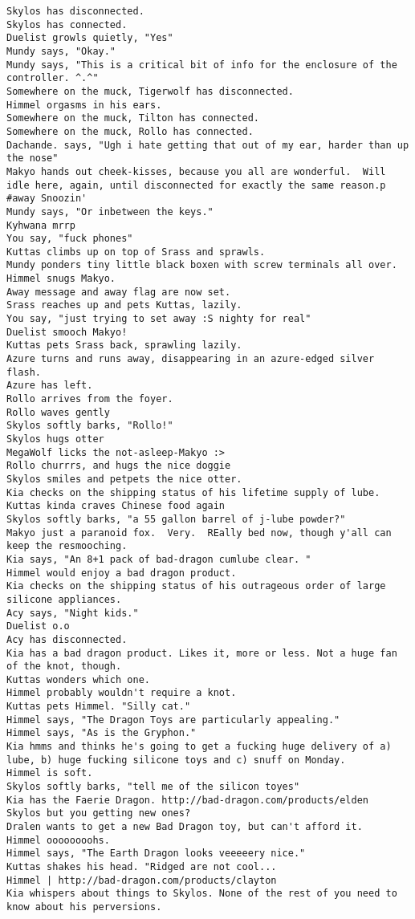 \begin{verbatim}
Skylos has disconnected.
Skylos has connected.
Duelist growls quietly, "Yes"
Mundy says, "Okay."
Mundy says, "This is a critical bit of info for the enclosure of the controller. ^.^"
Somewhere on the muck, Tigerwolf has disconnected.
Himmel orgasms in his ears.
Somewhere on the muck, Tilton has connected.
Somewhere on the muck, Rollo has connected.
Dachande. says, "Ugh i hate getting that out of my ear, harder than up the nose"
Makyo hands out cheek-kisses, because you all are wonderful.  Will idle here, again, until disconnected for exactly the same reason.p #away Snoozin'
Mundy says, "Or inbetween the keys."
Kyhwana mrrp
You say, "fuck phones"
Kuttas climbs up on top of Srass and sprawls.
Mundy ponders tiny little black boxen with screw terminals all over.
Himmel snugs Makyo.
Away message and away flag are now set.
Srass reaches up and pets Kuttas, lazily.
You say, "just trying to set away :S nighty for real"
Duelist smooch Makyo!
Kuttas pets Srass back, sprawling lazily.
Azure turns and runs away, disappearing in an azure-edged silver flash.
Azure has left.
Rollo arrives from the foyer.
Rollo waves gently
Skylos softly barks, "Rollo!"
Skylos hugs otter
MegaWolf licks the not-asleep-Makyo :>
Rollo churrrs, and hugs the nice doggie
Skylos smiles and petpets the nice otter.
Kia checks on the shipping status of his lifetime supply of lube.
Kuttas kinda craves Chinese food again
Skylos softly barks, "a 55 gallon barrel of j-lube powder?"
Makyo just a paranoid fox.  Very.  REally bed now, though y'all can keep the resmooching.
Kia says, "An 8+1 pack of bad-dragon cumlube clear. "
Himmel would enjoy a bad dragon product.
Kia checks on the shipping status of his outrageous order of large silicone appliances.
Acy says, "Night kids."
Duelist o.o
Acy has disconnected.
Kia has a bad dragon product. Likes it, more or less. Not a huge fan of the knot, though.
Kuttas wonders which one.
Himmel probably wouldn't require a knot.
Kuttas pets Himmel. "Silly cat."
Himmel says, "The Dragon Toys are particularly appealing."
Himmel says, "As is the Gryphon."
Kia hmms and thinks he's going to get a fucking huge delivery of a) lube, b) huge fucking silicone toys and c) snuff on Monday.
Himmel is soft.
Skylos softly barks, "tell me of the silicon toyes"
Kia has the Faerie Dragon. http://bad-dragon.com/products/elden
Skylos but you getting new ones?
Dralen wants to get a new Bad Dragon toy, but can't afford it.
Himmel oooooooohs.
Himmel says, "The Earth Dragon looks veeeeery nice."
Kuttas shakes his head. "Ridged are not cool...
Himmel | http://bad-dragon.com/products/clayton
Kia whispers about things to Skylos. None of the rest of you need to know about his perversions.

\end{verbatim}
